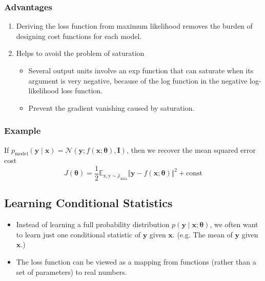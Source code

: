 \documentclass[12pt, a4paper]{article}
\def\vx{\boldsymbol{x}}
\def\vy{\boldsymbol{y}}
\def\vI{\boldsymbol{I}}
\def\vtheta{\boldsymbol{\theta}}
\def\vrmx{\boldsymbol{\mathrm{x}}}
\def\vrmy{\boldsymbol{\mathrm{y}}}
\newcommand{\condip}[3]{p(#1 \mid #2;#3)}
\newcommand{\ND}[3]{\mathcal{N}(#1;#2,#3)}
\begin{document}
\subsubsection{Advantages}
\begin{enumerate}
    \item Deriving the loss function from maximum likelihood removes the burden of designing cost functions for each model.
    \item Helps to avoid the problem of saturation
        \begin{itemize}
            \item Several output units involve an exp function that can saturate when its argument is very negative, because of the log function in the negative log-likelihood loss function.
            \item Prevent the gradient vanishing caused by saturation.
        \end{itemize}
\end{enumerate}
\subsubsection{Example}
If $p_\text{model}(\vy \mid \vx) = \ND{\vy}{f(\vx;\vtheta)}{\vI}$, then we recover the mean squared error cost
\[
    J(\vtheta) = \frac{1}{2} \mathbb{E}_{\vrmx,\vrmy\sim\hat{\rho}_\text{data}} \Vert \vy - f(\vx;\vtheta) \Vert^2 + \mathrm{const}
\]


\subsection{Learning Conditional Statistics}
\begin{itemize}
    \item Instead of learning a full probability distribution $\condip{\vy}{\vx}{\vtheta}$, we often want to learn just one conditional statistic of $\vy$ given $\vx$. (e.g. The mean of $\vy$ given $\vx$.)
    \item The loss function can be viewed as a mapping from functions (rather than a set of parameters) to real numbers.
\end{itemize}
\end{document}
